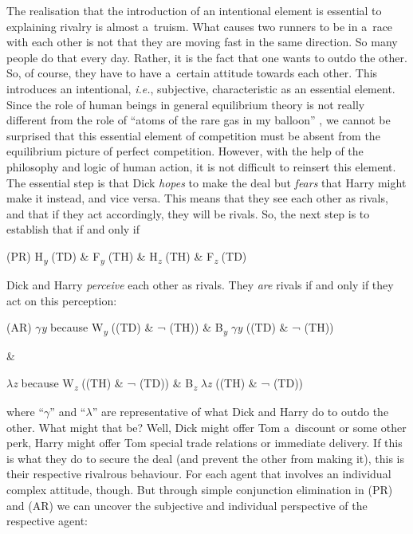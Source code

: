 The realisation that the introduction of an intentional element is essential to explaining rivalry is almost a~truism. What causes two runners to be in a~race with each other is not that they are moving fast in the same direction. So many people do that every day. Rather, it is the fact that one wants to outdo the other. So, of course, they have to have a~certain attitude towards each other. This introduces an intentional, \textit{i.e.}, subjective, characteristic as an essential element. Since the role of human beings in general equilibrium theory is not really different from the role of ``atoms of the rare gas in my balloon'' 
\parencite[][p.1411]{samuelson_modern_1966}, %
 we cannot be surprised that this essential element of competition must be absent from the equilibrium picture of perfect competition. However, with the help of the philosophy and logic of human action, it is not difficult to reinsert this element. The essential step is that Dick \textit{hopes} to make the deal but \textit{fears} that Harry might make it instead, and vice versa. This means that they see each other as rivals, and that if they act accordingly, they will be rivals. So, the next step is to establish that if and only if



(PR) H\textit{\textsubscript{y}} (TD) \& F\textit{\textsubscript{y}} (TH) \& H\textit{\textsubscript{z}} (TH) \& F\textit{\textsubscript{z}} (TD)



Dick and Harry \textit{perceive} each other as rivals. They \textit{are} rivals if and only if they act on this perception:



(AR) \textit{$\gamma $y} because W\textit{\textsubscript{y}} ((TD) \& ¬ (TH)) \& B\textit{\textsubscript{y}} \textit{$\gamma $y}  ((TD) \& ¬ (TH))



\&



\textit{$\lambda $z} because W\textit{\textsubscript{z}} ((TH) \& ¬ (TD)) \& B\textit{\textsubscript{z}} \textit{$\lambda $z}  ((TH) \& ¬ (TD))



where ``\textit{$\gamma $}'' and ``\textit{$\lambda $}'' are representative of what Dick and Harry do to outdo the other. What might that be? Well, Dick might offer Tom a~discount or some other perk, Harry might offer Tom special trade relations or immediate delivery. If this is what they do to secure the deal (and prevent the other from making it), this is their respective rivalrous behaviour. For each agent that involves an individual complex attitude, though. But through simple conjunction elimination in (PR) and (AR) we can uncover the subjective and individual perspective of the respective agent:



